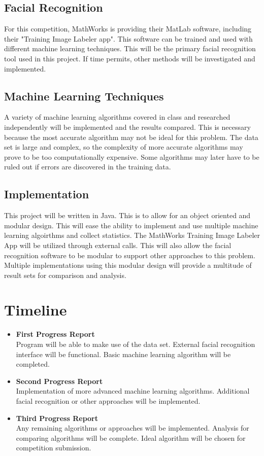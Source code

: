 \documentclass[11pt]{article}
\newcommand{\?}{\stackrel{?}{=}}
\begin{document}
\subsection{Facial Recognition}
For this competition, MathWorks is providing their MatLab software, including
their "Training Image Labeler app"\cite{kaggle_face}\cite{math_training}. This 
software can be trained and used with different machine learning techniques\cite{kaggle_face}\cite{math_cascade}. 
This will be the primary facial recognition tool used in this project. If time
permits, other methods will be investigated and implemented.

\subsection{Machine Learning Techniques}
A variety of machine learning algorithms covered in class and researched independently
will be implemented and the results compared. This is necessary because the most 
accurate algorithm may not be ideal for this problem. The data set is large and 
complex, so the complexity of more accurate algorithms may prove to be too 
computationally expensive. Some algorithms may later have to be ruled out 
if errors are discovered in the training data. 

\subsection{Implementation}
This project will be written in Java. This is to allow for an object oriented
and modular design. This will ease the ability to implement and use multiple
machine learning algoirthms and collect statistics. The MathWorks Training
Image Labeler App will be utilized through external calls\cite{kaggle_face}. This 
will also allow the facial recognition software to be modular to support 
other approaches to this problem. Multiple implementations using this modular 
design will provide a multitude of result sets for comparison and analysis.

\section{Timeline}
\begin{itemize}
\item[~]
\textbf{First Progress Report}\\
Program will be able to make use of the data set. External facial recognition 
interface will be functional. Basic machine learning algorithm will be completed.
\item[~]
\textbf{Second Progress Report}\\
Implementation of more advanced machine learning algorithms. Additional facial
recognition or other approaches will be implemented.
\item[~]
\textbf{Third Progress Report}\\
Any remaining algorithms or approaches will be implemented. Analysis for comparing
algorithms will be complete. Ideal algorithm will be chosen for competition submission.
\end{itemize}
\end{document}
